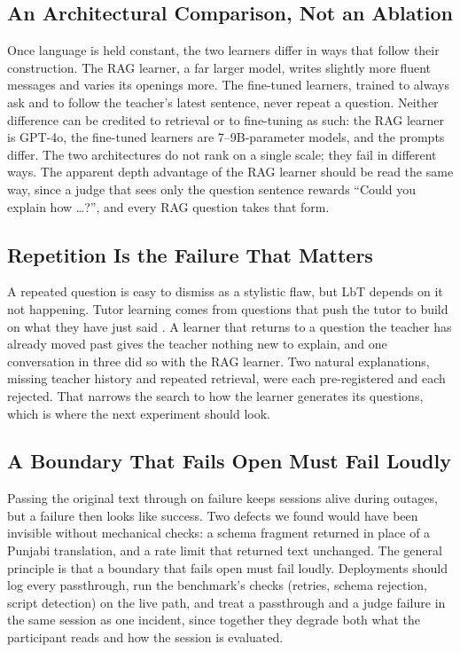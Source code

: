 \documentclass[pdflatex,sn-mathphys-num]{sn-jnl}%
\theoremstyle{thmstyleone}%
\theoremstyle{thmstyletwo}%
\theoremstyle{thmstylethree}%
\begin{document}
\subsection{An Architectural Comparison, Not an Ablation}

Once language is held constant, the two learners differ in ways that follow their construction. The
RAG learner, a far larger model, writes slightly more fluent messages and varies its openings more.
The fine-tuned learners, trained to always ask and to follow the teacher's latest sentence, never
repeat a question. Neither difference can be credited to retrieval or to fine-tuning as such: the RAG
learner is GPT-4o, the fine-tuned learners are 7--9B-parameter models, and the prompts differ. The
two architectures do not rank on a single scale; they fail in different ways. The apparent depth
advantage of the RAG learner should be read the same way, since a judge that sees only the question
sentence rewards ``Could you explain how \ldots?'', and every RAG question takes that form.

\subsection{Repetition Is the Failure That Matters}

A repeated question is easy to dismiss as a stylistic flaw, but LbT depends on it not happening.
Tutor learning comes from questions that push the tutor to build on what they have just said
\cite{roscoe2007}. A learner that returns to a question the teacher has already moved past gives the
teacher nothing new to explain, and one conversation in three did so with the RAG learner. Two
natural explanations, missing teacher history and repeated retrieval, were each pre-registered and
each rejected. That narrows the search to how the learner generates its questions, which is where
the next experiment should look.

\subsection{A Boundary That Fails Open Must Fail Loudly}

Passing the original text through on failure keeps sessions alive during outages, but a failure
then looks like success. Two defects we found would have been invisible without mechanical checks: a
schema fragment returned in place of a Punjabi translation, and a rate limit that returned text
unchanged. The general principle is that a boundary that fails open must fail loudly. Deployments
should log every passthrough, run the benchmark's checks (retries, schema rejection, script detection)
on the live path, and treat a passthrough and a judge failure in the same session as one incident,
since together they degrade both what the participant reads and how the session is evaluated.
\end{document}
